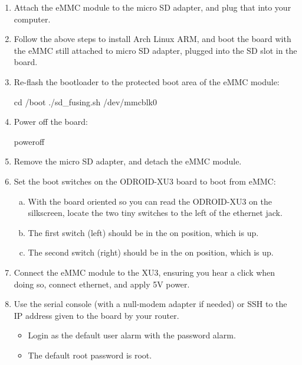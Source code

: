 \begin{enumerate}
\item    Attach the eMMC module to the micro SD adapter, and plug that into your computer.

\item    Follow the above steps to install Arch Linux ARM, and boot the board with the eMMC still attached to micro SD adapter, plugged into the SD slot in the board.

\item    Re-flash the bootloader to the protected boot area of the eMMC module:
\begin{bashcode}
cd /boot
./sd_fusing.sh /dev/mmcblk0
\end{bashcode}

\item    Power off the board:
\begin{bashcode}
poweroff
\end{bashcode}

\item    Remove the micro SD adapter, and detach the eMMC module.

\item    Set the boot switches on the ODROID-XU3 board to boot from eMMC:
    \begin{enumerate}[a.]
        \item With the board oriented so you can read the ODROID-XU3 on the silkscreen, locate the two tiny switches to the left of the ethernet jack.
        \item The first switch (left) should be in the on position, which is up.
        \item The second switch (right) should be in the on position, which is up.
    \end{enumerate}
    
\item    Connect the eMMC module to the XU3, ensuring you hear a click when doing so, connect ethernet, and apply 5V power.

\item    Use the serial console (with a null-modem adapter if needed) or SSH to the IP address given to the board by your router.
    \begin{itemize}
        \item Login as the default user alarm with the password alarm.
        \item The default root password is root.
    \end{itemize}

\end{enumerate}